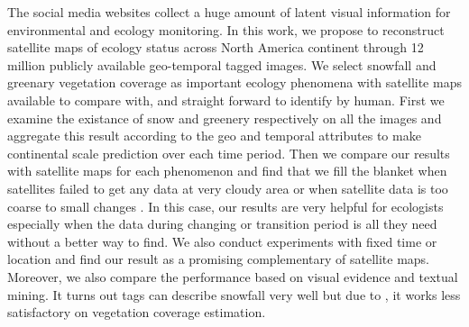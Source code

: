 \documentclass[10pt]{article}
\begin{document}
The  social media websites 
collect a huge amount of latent visual information for environmental and ecology monitoring.
In this work, we propose to reconstruct satellite maps of ecology status 
across North America continent 
through 12 million publicly available geo-temporal tagged images.
We select snowfall and greenary vegetation coverage as important ecology phenomena with satellite 
maps available to compare with, and straight forward  to identify by human. 
First we examine the existance of snow and greenery respectively on all the images and 
aggregate this result according to the geo and 
temporal attributes to make continental scale prediction over each time period. 
Then we compare our results with satellite maps for each phenomenon and find that we fill the blanket 
when satellites failed to get any data at very cloudy area or when satellite data is too 
coarse to small changes . In this case, our results are very helpful for ecologists especially when 
the data during changing or transition period is all they need without a better way to find. 
We also conduct experiments with fixed time or location and find our result 
as a promising complementary of satellite maps. Moreover, we also compare the performance based on visual evidence and textual mining. 
It turns out tags can describe snowfall very well but due to , it works less satisfactory on vegetation coverage estimation.


%
\end{document}
